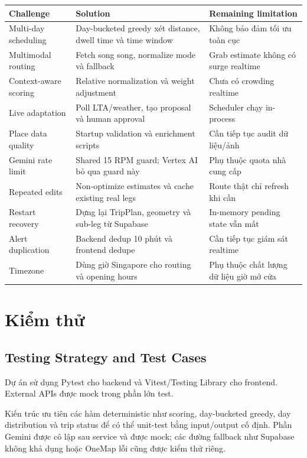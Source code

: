 \documentclass[12pt,a4paper]{article}
\begin{document}
\begin{longtable}{|L{3.2cm}|L{5.3cm}|L{5.5cm}|}
\hline
\textbf{Challenge} & \textbf{Solution} & \textbf{Remaining limitation} \\ \hline
\endhead
Multi-day scheduling & Day-bucketed greedy xét distance, dwell time và time window & Không bảo đảm tối ưu toàn cục \\ \hline
Multimodal routing & Fetch song song, normalize mode và fallback & Grab estimate không có surge realtime \\ \hline
Context-aware scoring & Relative normalization và weight adjustment & Chưa có crowding realtime \\ \hline
Live adaptation & Poll LTA/weather, tạo proposal và human approval & Scheduler chạy in-process \\ \hline
Place data quality & Startup validation và enrichment scripts & Cần tiếp tục audit dữ liệu/ảnh \\ \hline
Gemini rate limit & Shared 15 RPM guard; Vertex AI bỏ qua guard này & Phụ thuộc quota nhà cung cấp \\ \hline
Repeated edits & Non-optimize estimates và cache existing real legs & Route thật chỉ refresh khi cần \\ \hline
Restart recovery & Dựng lại TripPlan, geometry và sub-leg từ Supabase & In-memory pending state vẫn mất \\ \hline
Alert duplication & Backend dedup 10 phút và frontend dedupe & Cần tiếp tục giám sát realtime \\ \hline
Timezone & Dùng giờ Singapore cho routing và opening hours & Phụ thuộc chất lượng dữ liệu giờ mở cửa \\ \hline
\end{longtable}

\section{Kiểm thử}

\subsection{Testing Strategy and Test Cases}


Dự án sử dụng Pytest cho backend và Vitest/Testing Library cho frontend. External APIs được mock trong phần lớn test.

Kiến trúc ưu tiên các hàm deterministic như scoring, day-bucketed greedy, day distribution và trip status để có thể unit-test bằng input/output cố định. Phần Gemini được cô lập sau service và được mock; các đường fallback như Supabase không khả dụng hoặc OneMap lỗi cũng được kiểm thử riêng.
\end{document}

